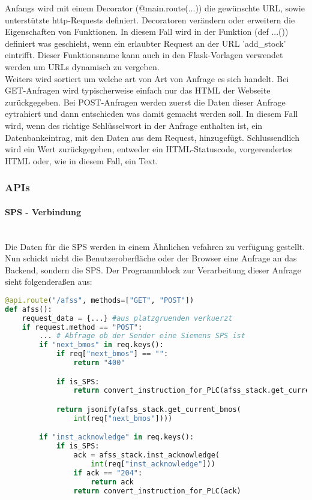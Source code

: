 Anfangs wird mit einem Decorator (@main.route(...)) die gewünschte URL, sowie unterstützte http-Requests definiert. Decoratoren verändern oder erweitern die Eigenschaften von Funktionen. In diesem Fall wird in der Funktion (def ...()) definiert was geschieht, wenn ein erlaubter Request an der URL 'add\_stock' eintrifft. Dieser Funktionsname kann auch in den Flask-Vorlagen verwendet werden um URLs dynamisch zu vergeben.\\
Weiters wird sortiert um welche art von Art von Anfrage es sich handelt. Bei GET-Anfragen wird typischerweise einfach nur das HTML der Webseite zurückgegeben. Bei POST-Anfragen werden zuerst die Daten dieser Anfrage eytrahiert und dann entschieden was damit gemacht werden soll. In diesem Fall wird, wenn des richtige Schlüsselwort in der Anfrage enthalten ist, ein Datenbankeintrag, mit den Daten aus dem Request, hinzugefügt. Schlussendlich wird ein Wert zurückgegeben, entweder ein HTML-Statuscode, vorgerendertes HTML oder, wie in diesem Fall, ein Text.

\subsubsection{APIs}

\paragraph{SPS - Verbindung}\mbox{}\\
Die Daten für die SPS werden in einem Ähnlichen vefahren zu verfügung gestellt. Nun schickt nicht die Benutzeroberfläche oder der Browser eine Anfrage an das Backend, sondern die SPS. Der Programmblock zur Verarbeitung dieser Anfrage sieht folgenderaßen aus:

\begin{lstlisting}[language=Python]
@api.route("/afss", methods=["GET", "POST"])
def afss():   
    request_data = {...} #aus platzgruenden verkuerzt
    if request.method == "POST":
        ... # Abfrage ob der Sender eine Siemens SPS ist
        if "next_bmos" in req.keys():
            if req["next_bmos"] == "":
                return "400"

            if is_SPS:
                return convert_instruction_for_PLC(afss_stack.get_current_bmos(int(req["next_bmos"])))

            return jsonify(afss_stack.get_current_bmos(
                int(req["next_bmos"])))

        if "inst_acknowledge" in req.keys():
            if is_SPS:
                ack = afss_stack.inst_acknowledge(
                    int(req["inst_acknowledge"]))
                if ack == "204":
                    return ack
                return convert_instruction_for_PLC(ack)
\end{lstlisting}  

